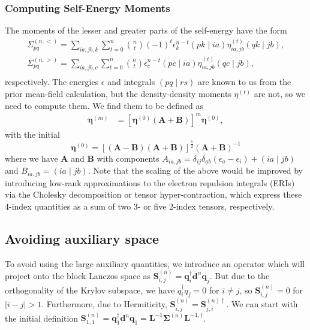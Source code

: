 \documentclass[12pt]{article} %
\begin{document}
\subsubsection{Computing Self-Energy Moments}
\label{sec:self_energy_moments}
The moments of the lesser and greater parts of the self-energy have the form
\begin{equation}
\begin{gathered}
\Sigma_{pq}^{(n,<)}=\sum_{ia, jb, k} \sum_{t=0}^n\binom{n}{t}(-1)^t \epsilon_k^{n-t}(pk \mid ia) \eta_{ia, jb}^{(t)}(qk \mid jb), \\
\Sigma_{pq}^{(n,>)}=\sum_{ia, jb, c} \sum_{t=0}^n\binom{n}{t} \epsilon_c^{n-t}(pc \mid ia) \eta_{ia, jb}^{(t)}(qc \mid jb),\\
\end{gathered}
\end{equation}
respectively. The energies $\epsilon$ and integrals $(pq \mid rs)$ are known to us from the prior mean-field calculation, but the density-density moments $\eta^{(t)}$ are not, so we need to compute them. We find them to be defined as
\begin{equation}
\begin{aligned}
\boldsymbol{\eta}^{(m)} 
& =\left[\boldsymbol{\eta}^{(0)}(\mathbf{A}+\mathbf{B})\right]^m \boldsymbol{\eta}^{(0)} ,
\end{aligned}
\end{equation}
with the initial
\begin{equation}
\boldsymbol{\eta}^{(0)}=[(\mathbf{A}-\mathbf{B})(\mathbf{A}+\mathbf{B})]^{\frac{1}{2}}(\mathbf{A}+\mathbf{B})^{-1} 
\end{equation}
where we have $\mathbf{A}$ and $\mathbf{B}$ with components $A_{ia,jb}=\delta_{ij}\delta_{ab}\left(\epsilon_a - \epsilon_i\right)+(ia \mid jb)$ and $B_{ia,jb}=(ia \mid jb)$.
Note that the scaling of the above would be improved by introducing low-rank approximations to the electron repulsion integrals (ERIs) via the Cholesky decomposition or tensor hyper-contraction, which express these 4-index quantities as a sum of two 3- or five 2-index tensors, respectively.
\subsection{Avoiding auxiliary space}
To avoid using the large auxiliary quantities, we introduce an operator which will project onto the block Lanczos space as $\mathbf{S}_{i,j}^{(n)} =\mathbf{q}_i^{\dagger} \mathbf{d}^n \mathbf{q}_j$. But due to the orthogonality of the Krylov subspace, we have $q_i^\dagger q_j = 0$ for $i\neq j$, so $\mathbf{S}_{i,j}^{(n)} = 0$ for $|i-j|>1$. Furthermore, due to Hermiticity, $\mathbf{S}_{i,j}^{(n)} = \mathbf{S}_{j,i}^{(n) \dagger}$. We can start with the initial definition $\mathbf{S}_{1,1}^{(n)} = \mathbf{q}_1^\dagger \mathbf{d}^n \mathbf{q}_1 = \mathbf{L}^{-1} \mathbf{\Sigma}^{(n)} \mathbf{L}^{-1, \dagger}$.
\end{document}
